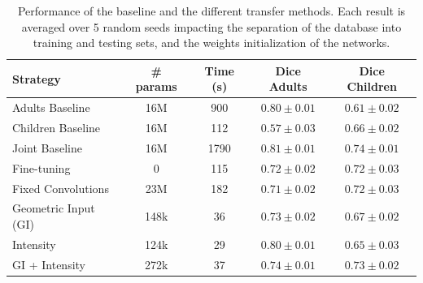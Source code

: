 \begin{table}[htb]
	\centering
\begin{tabular}{|l|c|c|c|c|}
	\hline
    Strategy & \# params & Time (s) & Dice Adults & Dice Children \\
	\hline
    Adults Baseline & 16M & 900 & $\bm{0.80 \pm 0.01}$ & $0.61 \pm 0.02$ \\
    Children Baseline & 16M & 112 & $0.57 \pm 0.03$ & $\bm{0.66 \pm 0.02}$ \\
    Joint Baseline & 16M & 1790 & $\bm{0.81 \pm 0.01}$ & $\bm{0.74 \pm 0.01}$ \\
    \hline
    Fine-tuning & 0 & 115 & $0.72 \pm 0.02$ & $0.72 \pm 0.03$ \\
    Fixed Convolutions & 23M & 182 & $0.71 \pm 0.02$ & $0.72 \pm 0.03$ \\
    Geometric Input (GI) & 148k & 36 & $0.73 \pm 0.02$ & $0.67 \pm 0.02$ \\
    Intensity & 124k & 29 & $0.80 \pm 0.01$ & $0.65 \pm 0.03$ \\
    GI + Intensity & 272k & 37 & $\bm{0.74 \pm 0.01}$ & $\bm{0.73 \pm 0.02}$ \\
    \hline
\end{tabular}
	\vspace{2mm}
	\caption{Performance of the baseline and the different transfer methods. Each result is averaged over 5 random seeds impacting the separation of the database into training and testing sets, and the weights initialization of the networks.}
    \label{table:results}
\end{table}

